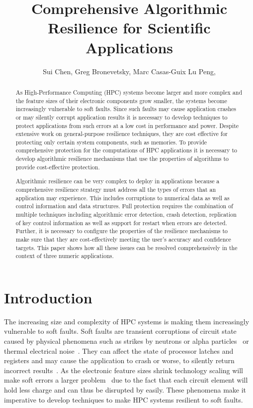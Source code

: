 \documentclass{sig-alternate}
\title{Comprehensive Algorithmic Resilience for Scientific Applications}
\author{Sui Chen, 
Greg Bronevetsky, Marc Casas-Guix
Lu Peng,
}
\begin{document}
\maketitle

\begin{abstract}
As High-Performance Computing (HPC) systems become larger and more complex and the feature sizes of their electronic components grow smaller, the systems become increasingly vulnerable to soft faults.
Since such faults may cause application crashes or may silently corrupt application results it is necessary to develop techniques to protect applications from such errors at a low cost in performance and power.
Despite extensive work on general-purpose resilience techniques, they are cost effective for protecting only certain system components, such as memories.
To provide comprehensive protection for the computations of HPC applications it is necessary to develop algorithmic resilience mechanisms that use the properties of algorithms to provide cost-effective protection.

Algorithmic resilience can be very complex to deploy in applications because a comprehensive resilience strategy must address all the types of errors that an application may experience.
This includes corruptions to numerical data as well as control information and data structures.
Full protection requires the combination of multiple techniques including algorithmic error detection, crash detection, replication of key control information as well as support for restart when errors are detected.
Further, it is necessary to configure the properties of the resilience mechanisms to make sure that they are cost-effectively meeting the user's accuracy and confidence targets.
This paper shows how all these issues can be resolved comprehensively in the context of three numeric applications.

\end{abstract}

\section{Introduction}
\label{sec:intro}

The increasing size and complexity of HPC systems is making them increasingly vulnerable to soft faults.
Soft faults are transient corruptions of circuit state caused by physical phenomena such as strikes by neutrons or alpha particles~\cite{baumann:2005, asciQSER:2005} or thermal electrical noise~\cite{therm_noise:2007}.
They can affect the state of processor latches and registers and may cause the application to crash or worse, to silently return incorrect results~\cite{mpi_ser:reed:2004}.
As the electronic feature sizes shrink technology scaling will make soft errors a larger problem~\cite{err_scaling:2012} due to the fact that each circuit element will hold less charge and can thus be disrupted by easily.
These phenomena make it imperative to develop techniques to make HPC systems resilient to soft faults.
\end{document}
